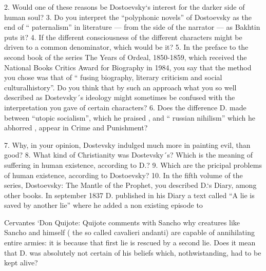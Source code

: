 2. Would one of these reasons be Dostoevsky`s interest for the darker
side of human soul? 3. Do you interpret the ``polyphonic novels'' of
Dostoevsky as the end of `` paternalism'' in literature --- from the side
of the narrator --- as Bakhtin puts it? 4. If the different consciousness
of the different characters might be driven to a common denominator,
which would be it? 5. In the preface to the second book of the series
The Years of Ordeal, 1850-1859, which received the National Books
Critics Award for Biography in 1984, you say that the method you chose
was that of `` fusing biography, literary criticism and social
culturalhistory''. Do you think that by such an approach what you so
well described as Dostevsky´s ideology might sometimes be confused with
the interpretation you gave of certain characters? 6. Does the
difference D. made between ``utopic socialism'', which he praised , and
`` russian nihilism'' which he abhorred , appear in Crime and
Punishment?

7. Why, in your opinion, Dostevsky indulged much more in painting evil,
than good? 8. What kind of Christianity was Dostevsky´s? Which is the
meaning of suffering in human existence, according to D.? 9. Which are
the pricipal problems of human existence, according to Dostoevsky? 10.
In the fifth volume of the series, Dostoevsky: The Mantle of the
Prophet, you described D.`s Diary, among other books. In september 1837
D. published in his Diary a text called ``A lie is saved by another
lie'' where he added a non existing episode to

Cervantes `Don Quijote: Quijote comments with Sancho why creatures like
Sancho and himself ( the so called cavalieri andanti) are capable of
annihilating entire armies: it is because that first lie is rescued by a
second lie. Does it mean that D. was absolutely not certain of his
beliefs which, nothwistanding, had to be kept alive?

